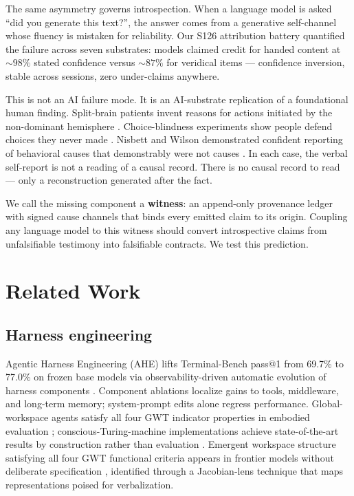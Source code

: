 \documentclass[11pt]{article}
\begin{document}
The same asymmetry governs introspection. When a language model is asked
``did you generate this text?'', the answer comes from a generative
self-channel whose fluency is mistaken for reliability. Our S126
attribution battery \citep{s126} quantified the failure across seven
substrates:
models claimed credit for handed content at ${\sim}98\%$ stated confidence
versus ${\sim}87\%$ for veridical items --- confidence inversion, stable
across sessions, zero under-claims anywhere.

This is not an AI failure mode. It is an AI-substrate replication of a
foundational human finding. Split-brain patients invent reasons for actions
initiated by the non-dominant hemisphere \citep{gazzaniga2000}.
Choice-blindness experiments show people defend choices they never made
\citep{johansson2005}. Nisbett and Wilson demonstrated confident reporting
of behavioral causes that demonstrably were not causes \citep{nisbett1977}. In each case, the verbal self-report is
not a reading of a causal record. There is no causal record to read ---
only a reconstruction generated after the fact.

We call the missing component a \textbf{witness}: an append-only
provenance ledger with signed cause channels that binds every emitted
claim to its origin. Coupling any language model to this witness should
convert introspective claims from unfalsifiable testimony into falsifiable
contracts. We test this prediction.

\section{Related Work}\label{sec:related}

\subsection{Harness engineering}

Agentic Harness Engineering (AHE) lifts Terminal-Bench pass@1 from
69.7\% to 77.0\% on frozen base models via observability-driven automatic
evolution of harness components \citep{lin2026ahe}. Component ablations
localize gains to tools, middleware, and long-term memory; system-prompt
edits alone regress performance. Global-workspace agents satisfy all four
GWT indicator properties in embodied evaluation
\citep{baars1997,atallah2026gwt};
conscious-Turing-machine implementations achieve state-of-the-art results
by construction rather than evaluation \citep{yu2026ctmai}. Emergent
workspace structure satisfying all four GWT functional criteria appears in
frontier models without deliberate specification \citep{gurnee2026},
identified through a Jacobian-lens technique that maps representations
poised for verbalization.
\end{document}
